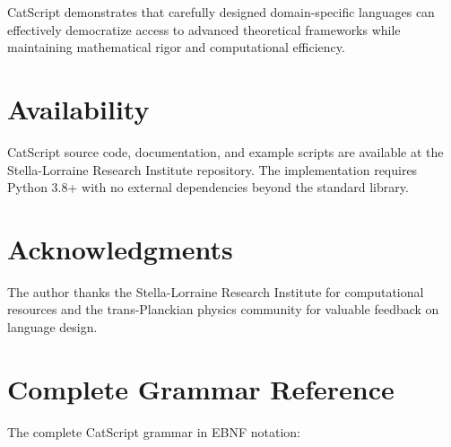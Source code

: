 \documentclass[twocolumn,10pt]{article}
\begin{document}
CatScript demonstrates that carefully designed domain-specific languages can effectively democratize access to advanced theoretical frameworks while maintaining mathematical rigor and computational efficiency.

\section*{Availability}

CatScript source code, documentation, and example scripts are available at the Stella-Lorraine Research Institute repository. The implementation requires Python 3.8+ with no external dependencies beyond the standard library.

\section*{Acknowledgments}

The author thanks the Stella-Lorraine Research Institute for computational resources and the trans-Planckian physics community for valuable feedback on language design.




\appendix

\section{Complete Grammar Reference}

The complete CatScript grammar in EBNF notation:
\end{document}
